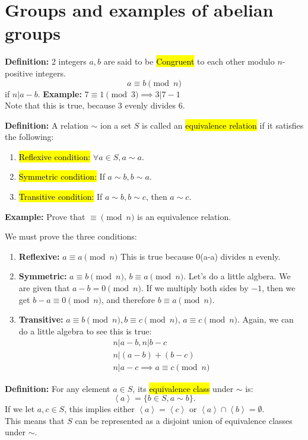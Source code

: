 \documentclass[12pt]{report}
\newcommand{\examples}[1]{{\leavevmode\color{red} #1}}
\newcommand{\definitions}[1]{{\leavevmode\color{OliveGreen} #1}}
\newcommand{\proof}[1]{{\leavevmode\color{purple} #1}}
\begin{document}
	\section{Groups and examples of abelian groups}
	\definitions{
		\textbf{Definition: }2 integers $a,b$ are said to be \hl{Congruent} to each other modulo $n$-positive integers. $$a\equiv b\pmod n$$ if $n|a-b$.
	}
	\vskip 0.1in
	\examples{
		\textbf{Example: }
		$7\equiv 1 \pmod 3\implies 3|7-1$\\
		Note that this is true, because 3 evenly divides 6. 
	}
	\vskip 0.1in
	\definitions{
		\textbf{Definition: } A relation $\sim$ ion a set $S$ is called an \hl{equivalence relation} if it satisfies the following: 
		\begin{enumerate}
			\item \hl{Reflexive condition:} $\forall a\in S, a\sim a$. 
			\item \hl{Symmetric condition:} If $a\sim b, b\sim a$. 
			\item \hl{Transitive condition:} If $a\sim b, b\sim c$, then $a\sim c$. 
		\end{enumerate}
	}
	\examples{
		\textbf{Example:} Prove that $\equiv\pmod n$ is an equivalence relation. 
	}
	\vskip 0.1in
	\proof{
		We must prove the three conditions: 
		\begin{enumerate}
			\item \textbf{Reflexive: }$a\equiv a\pmod n$ This is true because 0(a-a) divides n evenly. 
			\item \textbf{Symmetric: }$a\equiv b\pmod n$, $b\equiv a\pmod n$. Let's do a little algbera. We are given that $a-b=0\pmod n$. If we multiply both sides by $-1$, then we get $b-a\equiv 0\pmod n$, and therefore $b\equiv a\pmod n$. 
			\item\textbf{Transitive: }$a\equiv b\pmod n, b\equiv c\pmod n$, $a\equiv c\pmod n$. Again, we can do a little algebra to see this is true: 
			\begin{gather}
				n|a-b, n|b-c\\
				n|(a-b)+(b-c)\\
				n|a-c \implies a\equiv c\pmod n
			\end{gather}
		\end{enumerate}
	}
	\definitions{
		\textbf{Definition: } For any element $a\in S$, its \hl{equivalence class} under $\sim$ is: $$\left<a\right>=\{b\in S, a\sim b\}.$$
		If we let $a,c\in S$, this implies either $\left<a\right>=\left<c\right>$ or $\left<a\right>\cap\left<b\right>=\emptyset$. \\
		This means that $S$ can be represented as a disjoint union of equivalence classes under $\sim$. 
	}
\end{document}
